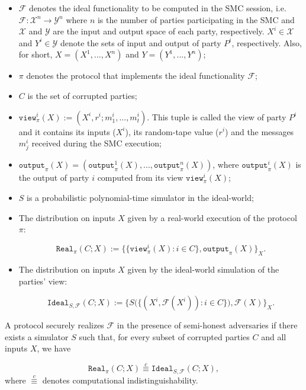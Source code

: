 \begin{itemize}
    \item $\mathcal{F}$ denotes the ideal functionality to be computed in the SMC session, i.e. $\mathcal{F}: \mathcal{X}^n \rightarrow \mathcal{Y}^n$ where $n$ is the number of parties participating in the SMC and $\mathcal{X}$ and $\mathcal{Y}$ are the input and output space of each party, respectively. $X^i\in \mathcal{X}$ and $Y^i\in \mathcal{Y}$ denote the sets of input and output of party $P^i$, respectively. Also, for short, $X = (X^1, ..., X^n)$ and $Y = (Y^1, ..., Y^n)$;
    \item $\pi$ denotes the protocol that implements the ideal functionality $\mathcal{F}$;
    \item $C$ is the set of corrupted parties;
    \item $\mathtt{view}^i_\pi(X) := (X^i, r^i; m_1^i,...,m_t^i)$. This tuple is called the view of party $P^i$ and it contains its inputs ($X^i$), its random-tape value ($r^i$) and the messages $m_j^i$ received during the SMC execution;
    \item $\mathtt{output}_\pi(X) = (\mathtt{output}^1_\pi(X), ..., \mathtt{output}^n_\pi(X))$, where $\mathtt{output}^i_\pi(X)$ is the output of party $i$ computed from its view $\mathtt{view}^i_\pi(X)$;
    \item $S$ is a probabilistic polynomial-time simulator in the ideal-world;
    \item The distribution on inputs $X$ given by a real-world execution of the protocol $\pi$:
    
    \begin{equation*}
    \mathtt{Real}_\pi(C; X):=\big\{\{ \mathtt{view}^i_\pi(X) : i\in C \}, \mathtt{output}_\pi(X) \big\}_{X}.
    \end{equation*}
    
    \item The distribution on inputs $X$ given by the ideal-world simulation of the parties' view: 
    
    \begin{equation*}
    \mathtt{Ideal}_{S,\mathcal{F}}(C; X):=\big\{ S\big(\{(X^i, \mathcal{F}(X^i)) : i\in C \}\big), \mathcal{F}(X) \big\}_X.
    \end{equation*}
\end{itemize}

\begin{definition}\label{def:security}
A protocol securely realizes $\mathcal{F}$ in the presence of semi-honest adversaries if there exists a simulator $S$ such that, for every subset of corrupted parties $C$ and all inputs $X$, we have

\begin{equation}
    \mathtt{Real}_\pi(C; X) \stackrel{c}{\equiv} \mathtt{Ideal}_{S, \mathcal{F}}(C; X),
    \label{eq:SH_security}
\end{equation}
where $\stackrel{c}{\equiv}$ denotes computational indistinguishability.

\end{definition}

